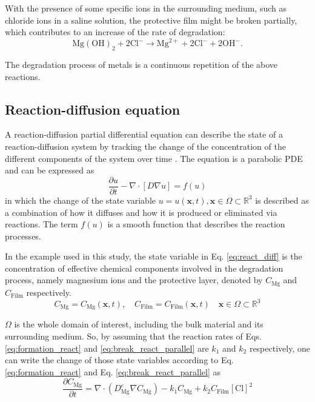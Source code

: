 With the presence of some specific ions in the surrounding medium, such as chloride ions in a saline solution, the protective film might be broken partially, which contributes to an increase of the rate of degradation:
\begin{equation} \label{eq:break_react_parallel}
\mathrm{Mg}(\mathrm{OH})_{2}+2\mathrm{Cl}^{-} \longrightarrow \mathrm{Mg}^{2+} + 2\mathrm{Cl}^{-} + 2\mathrm{OH}^{-}.
\end{equation}

The degradation process of metals is a continuous repetition of the above reactions.


\subsection{Reaction-diffusion equation}

A reaction-diffusion partial differential equation can describe the state of a reaction-diffusion system by tracking the change of the concentration of the different components of the system over time \cite{Grindrod1996}. The equation is a parabolic {PDE} and can be expressed as
\begin{equation} \label{eq:react_diff}
\frac{\partial u}{\partial t}-\nabla \cdot [D \nabla u]=f(u)
\end{equation}
\noindent in which the change of the state variable $u=u(\mathbf{x},t), \mathbf{x} \in \Omega \subset \mathbb{R}^{3}$ is described as a combination of how it diffuses and how it is produced or eliminated via reactions. The term $f(u)$ is a smooth function that describes the reaction processes.

In the example used in this study, the state variable in Eq. \ref{eq:react_diff} is the concentration of effective chemical components involved in the degradation process, namely magnesium ions and the protective layer, denoted by $C_{\mathrm{Mg}}$ and $C_{\mathrm{Film}}$ respectively.
\begin{equation}
C_{\mathrm{Mg}} = C_{\mathrm{Mg}}(\mathbf{x},t), \quad C_{\mathrm{Film}} = C_{\mathrm{Film}}(\mathbf{x},t) \quad \mathbf{x} \in \Omega \subset \mathbb{R}^{3}
\end{equation}

\noindent  $\Omega$ is the whole domain of interest, including the bulk material and its surrounding medium. So, by assuming that the reaction rates of Eqs. \ref{eq:formation_react} and \ref{eq:break_react_parallel} are $k_1$ and $k_2$ respectively,  one can write the change of those state variables according to Eq. \ref{eq:formation_react} and Eq. \ref{eq:break_react_parallel} as
\begin{equation} \label{eq:pde_mg_primary}
\frac{\partial C_{\mathrm{Mg}}}{\partial t}=\nabla \cdot \left(D_{\mathrm{Mg}}^{e}   \nabla C_{\mathrm{Mg}} \right)-k_{1} C_{\mathrm{Mg}} +k_{2} C_{\mathrm{Film}} [\mathrm{Cl}]^{2}
\end{equation}

